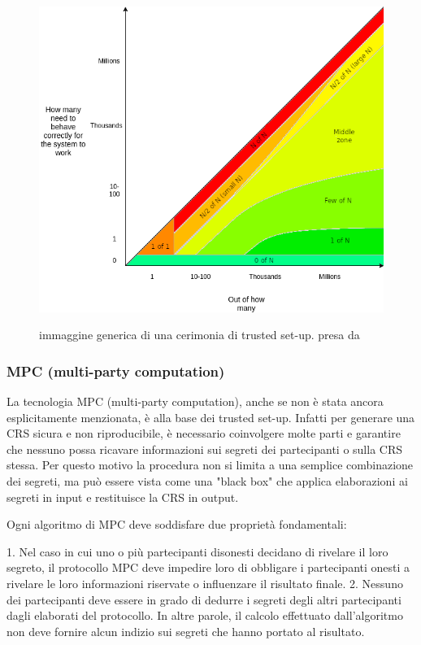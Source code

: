 \begin{figure}[H]
    \centering
    \includegraphics[width=13cm]{./chapters/1.state-of-art/images/12.trusted_models.png}
    \label{fig:trusted_setups}
    \captionsetup{justification=centering}
    \caption{immaggine generica di una cerimonia di trusted set-up. presa da \cite{how-do-trusted-setups-work}}
\end{figure}

\subsubsection{MPC (multi-party computation)}
La tecnologia MPC (multi-party computation), anche se non è stata ancora esplicitamente menzionata, è alla base dei
trusted set-up. Infatti per generare una CRS sicura e non riproducibile, è necessario coinvolgere molte parti e
garantire che nessuno possa ricavare informazioni sui segreti dei partecipanti o sulla CRS stessa. Per questo motivo la
procedura non si limita a una semplice combinazione dei segreti, ma può essere vista come una "black box" che applica
elaborazioni ai segreti in input e restituisce la CRS in output.

Ogni algoritmo di MPC deve soddisfare due proprietà fondamentali:

1. Nel caso in cui uno o più partecipanti disonesti decidano di rivelare il loro segreto, il protocollo MPC deve
impedire loro di obbligare i partecipanti onesti a rivelare le loro informazioni riservate o influenzare il risultato
finale. 2. Nessuno dei partecipanti deve essere in grado di dedurre i segreti degli altri partecipanti dagli elaborati
del protocollo. In altre parole, il calcolo effettuato dall'algoritmo non deve fornire alcun indizio sui segreti che
hanno portato al risultato.
